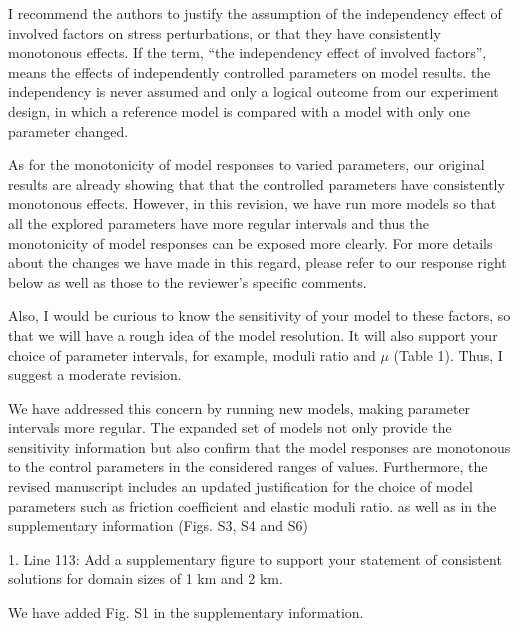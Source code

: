 \documentclass[12pt]{article}
\begin{document}
\begin{response}{I recommend the authors to justify the assumption of the independency effect of involved factors on stress perturbations, or that they have consistently monotonous effects.}
    If the term, ``the independency effect of involved factors'', means the effects of independently controlled parameters on model results. the independency is never assumed and only a logical outcome from our experiment design, in which a reference model is compared with a model with only one parameter changed. 

As for the monotonicity of model responses to varied parameters, our original results are already showing that that the controlled parameters have consistently monotonous effects. However, in this revision, we have run more models so that all the explored parameters have more regular intervals and thus the monotonicity of model responses can be exposed more clearly. For more details about the changes we have made in this regard, please refer to our response right below as well as those to the reviewer's specific comments.
\end{response}

\begin{response}{Also, I would be curious to know the sensitivity of your model to these factors, so that we will have a rough idea of the model resolution. It will also support your choice of parameter intervals, for example, moduli ratio and $\mu$ (Table 1). Thus, I suggest a moderate revision.}

    We have addressed this concern by running new models, making parameter intervals more regular. The expanded set of models not only provide the sensitivity information but also confirm that the model responses are monotonous to the control parameters in the considered ranges of values. Furthermore, the revised manuscript includes an updated justification for the choice of model parameters such as friction coefficient and elastic moduli ratio. as well as  in the supplementary information (Figs. S3, S4 and S6) 
\end{response}



\begin{response}{1. Line 113: Add a supplementary figure to support your statement of consistent solutions for domain sizes of 1 km and 2 km.}
  
We have added Fig. S1 in the supplementary information. 
    
\end{response}
\end{document}
